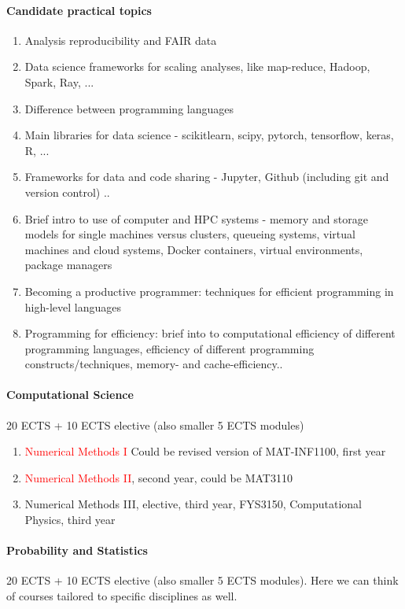 \documentclass[oneside,final,10pt]{article}
\begin{document}
\paragraph{Candidate practical topics}
\begin{enumerate}
\item Analysis reproducibility and FAIR data
\item Data science frameworks for scaling analyses, like map-reduce, Hadoop, Spark, Ray, ...
\item Difference between programming languages
\item Main libraries for data science - scikitlearn, scipy, pytorch, tensorflow, keras, R, ...
\item Frameworks for data and code sharing - Jupyter, Github (including git and version control) ..
\item Brief intro to use of computer and HPC systems - memory and storage models for single machines versus clusters, queueing systems, virtual machines and cloud systems, Docker containers, virtual environments, package managers
\item Becoming a productive programmer: techniques for efficient programming in high-level languages 
\item Programming for efficiency: brief into to computational efficiency of different programming languages, efficiency of different programming constructs/techniques, memory- and cache-efficiency..
\end{enumerate}

\paragraph{Computational Science}
20 ECTS + 10 ECTS elective (also smaller 5 ECTS modules)
\begin{enumerate}
    \item \textcolor{red}{Numerical Methods I} Could be revised version of MAT-INF1100, first year
    \item \textcolor{red}{Numerical Methods II}, second year, could be MAT3110
    \item Numerical Methods III, elective,  third year, FYS3150, Computational Physics, third year
\end{enumerate}

\paragraph{Probability and Statistics}
20 ECTS + 10 ECTS elective (also smaller 5 ECTS modules). Here we can think of courses tailored to specific disciplines as well. 
\end{document}
